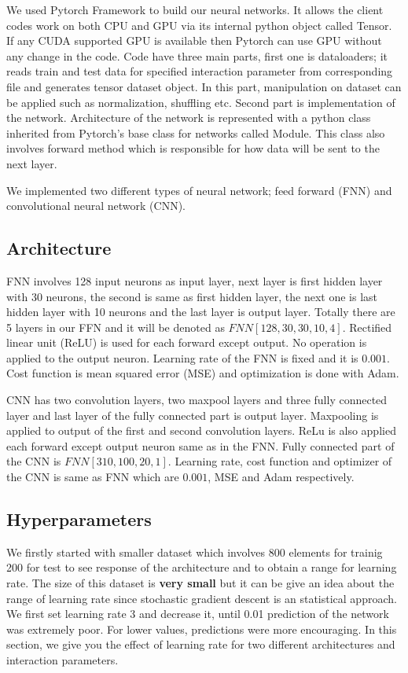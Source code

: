 \documentclass[a4paper,times,12pt]{article}
\begin{document}
We used Pytorch Framework \cite{paszke2017automatic} to build our neural networks. It allows the client codes work on both CPU and GPU via its internal python object called Tensor. If any CUDA supported GPU is available then Pytorch can use GPU without any change in the code. Code have three main parts, first one is dataloaders; it reads train and test data for specified interaction parameter from corresponding file and generates tensor dataset object. In this part, manipulation on dataset can be applied such as normalization, shuffling etc. Second part is implementation of the network. Architecture of the network is represented with a python class inherited from Pytorch's base class for networks called Module. This class also involves forward method which is responsible for how data will be sent to the next layer. 


We implemented two different types of neural network; feed forward (FNN) and convolutional neural network (CNN).


\subsection{Architecture}

FNN involves 128 input neurons as input layer, next layer is first hidden layer with 30 neurons, the second is same as first hidden layer, the next one is last hidden layer with 10 neurons and the last layer is output layer. Totally there are 5 layers in our FFN and it will be denoted as $FNN[128, 30, 30, 10, 4]$. Rectified linear unit (ReLU) is used for each forward except output. No operation is applied to the output neuron. Learning rate of the FNN is fixed and it is $0.001$. Cost function is mean squared error (MSE) and optimization is done with Adam. 


CNN has two convolution layers, two maxpool layers and three fully connected layer and last layer of the fully connected part is output layer. Maxpooling is applied to output of the first and second convolution layers. ReLu is also applied each forward except output neuron same as in the FNN. Fully connected part of the CNN is $FNN[310, 100, 20, 1]$. Learning rate, cost function and optimizer of the CNN is same as FNN which are $0.001$, MSE and Adam respectively.


\subsection{Hyperparameters}

We firstly started with smaller dataset which involves 800 elements for trainig 200 for test to see response of the architecture and to obtain a range for learning rate. The size of this dataset is \textbf{very small} but it can be give an idea about the range of learning rate since stochastic gradient descent is an statistical approach. We first set learning rate 3 and decrease it, until 0.01 prediction of the network was extremely poor. For lower values, predictions were more encouraging. In this section, we give you the effect of learning rate for two different architectures and interaction parameters. 
\end{document}
